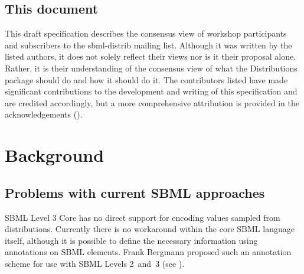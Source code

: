\documentclass[draftspec]{sbmlpkgspec}
\newcommand{\distrib}{Distributions\xspace}
\newcommand{\watchout}{\marginpar{\hspace*{34pt}\raisebox{-0.5ex}{\Large\ding{43}}}}
\newcommand{\controversial}{\marginpar{\hspace*{34pt}\raisebox{-0.5ex}{\Large?}}}
\begin{document}
\subsection{This document}

This draft specification describes the consensus view of workshop participants and subscribers to the sbml-distrib mailing list. Although it was written by the listed authors, it does not solely reflect their views nor is it their proposal alone. Rather, it is their understanding of the consensus view of what the \distrib package should do and how it should do it. The contributors listed have made significant contributions to the development and writing of this specification and are credited accordingly, but a more comprehensive attribution is provided in the acknowledgements ().



\section{Background}

\subsection{Problems with current SBML approaches}

SBML Level 3 Core has no direct support for encoding values sampled from distributions. Currently there is no workaround within the core SBML
language itself, although it is possible to define the necessary information
using annotations on SBML elements. Frank Bergmann proposed such an annotation scheme for use with SBML Levels 2~and~3 (see ).
\end{document}
